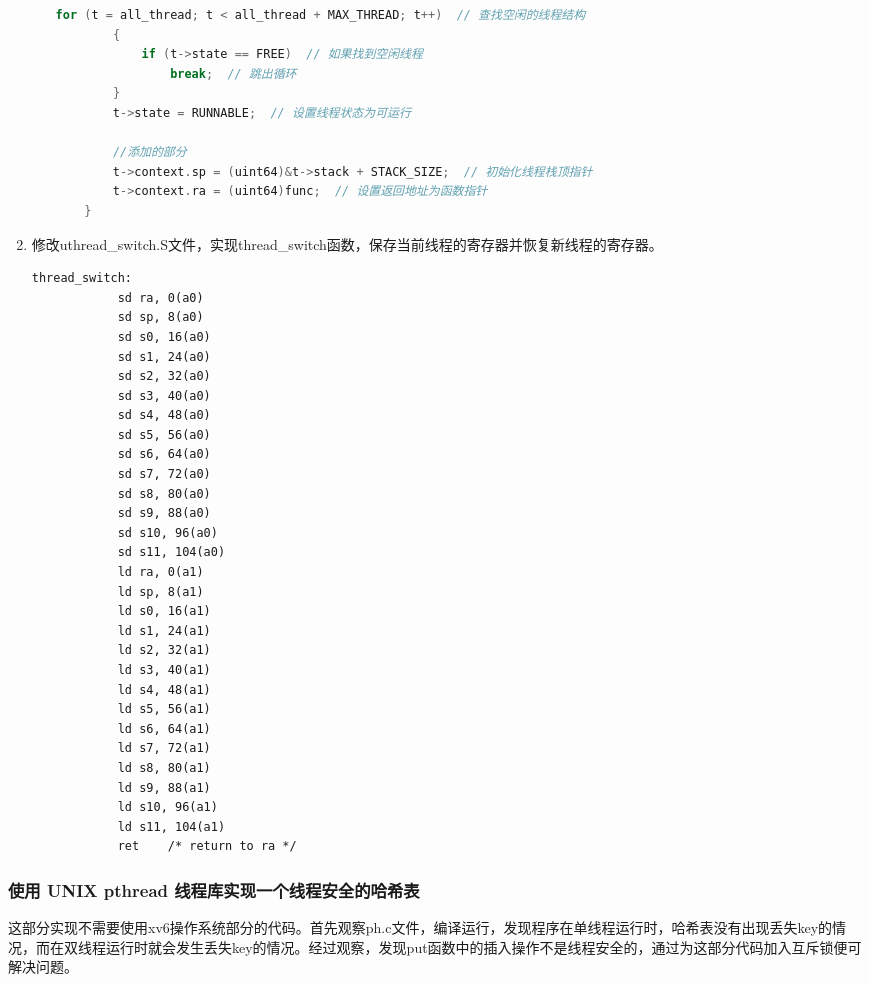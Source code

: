 \begin{enumerate}
\begin{itemize}
\begin{lstlisting}[language=c,title=对thread\_create函数的修改]
        for (t = all_thread; t < all_thread + MAX_THREAD; t++)  // 查找空闲的线程结构
        {
            if (t->state == FREE)  // 如果找到空闲线程
                break;  // 跳出循环
        }
        t->state = RUNNABLE;  // 设置线程状态为可运行

        //添加的部分
        t->context.sp = (uint64)&t->stack + STACK_SIZE;  // 初始化线程栈顶指针
        t->context.ra = (uint64)func;  // 设置返回地址为函数指针
    }
            \end{lstlisting}
          \end{itemize}

    \item 修改uthread\_switch.S文件，实现thread\_switch函数，保存当前线程的寄存器并恢复新线程的寄存器。
          \begin{lstlisting}[language={[x86masm]Assembler},title=实现thread\_switch汇编]
        thread_switch:
            sd ra, 0(a0)
            sd sp, 8(a0)
            sd s0, 16(a0)
            sd s1, 24(a0)
            sd s2, 32(a0)
            sd s3, 40(a0)
            sd s4, 48(a0)
            sd s5, 56(a0)
            sd s6, 64(a0)
            sd s7, 72(a0)
            sd s8, 80(a0)
            sd s9, 88(a0)
            sd s10, 96(a0)
            sd s11, 104(a0)
            ld ra, 0(a1)
            ld sp, 8(a1)
            ld s0, 16(a1)
            ld s1, 24(a1)
            ld s2, 32(a1)
            ld s3, 40(a1)
            ld s4, 48(a1)
            ld s5, 56(a1)
            ld s6, 64(a1)
            ld s7, 72(a1)
            ld s8, 80(a1)
            ld s9, 88(a1)
            ld s10, 96(a1)
            ld s11, 104(a1)
            ret    /* return to ra */
        \end{lstlisting}
\end{enumerate}

\subsubsection{使用 UNIX pthread 线程库实现一个线程安全的哈希表}
这部分实现不需要使用xv6操作系统部分的代码。首先观察ph.c文件，编译运行，发现程序在单线程运行时，哈希表没有出现丢失key的情况，而在双线程运行时就会发生丢失key的情况。经过观察，发现put函数中的插入操作不是线程安全的，通过为这部分代码加入互斥锁便可解决问题。

